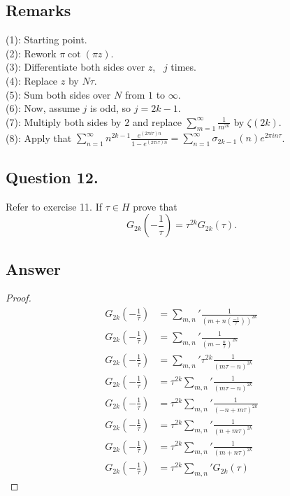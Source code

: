 \subsection*{Remarks}
\noindent
(1): Starting point.\\
(2): Rework $\pi \cot(\pi z) $. \\
(3): Differentiate both sides over $z$, \  $j$ times. \\
(4): Replace $z$ by $N\tau$. \\
(5): Sum both sides over $N$ from $1$ to $\infty$.\\
(6): Now, assume $j$ is odd, so $j=2k-1$. \\
(7): Multiply both sides by $2$ and replace $\sum_{m=1}^\infty \frac{1}{m^{2k}}$ by $\zeta(2k)$.\\
(8): Apply that $\sum_{n=1}^\infty n^{2k-1} \frac{e^{(2 \pi i \tau)n}}{1-e^{(2 \pi i \tau)n}} = \sum_{n=1}^{\infty}\sigma_{2k-1}(n)e^{2\pi i n \tau}$.

\subsection{Question 12.}
\noindent
Refer to exercise 11. If $\tau \in H$ prove that
\[
    G_{2k}(-\frac{1}{\tau}) = \tau^{2k} G_{2k}(\tau).
\]

\subsection*{Answer}

\begin{proof}
    \begin{align*}
        G_{2k}(-\frac{1}{\tau}) &= \sum_{m,n}{'} \frac{1}{(m + n (\frac{-1}{\tau}))^{2k}} \\
        G_{2k}(-\frac{1}{\tau}) &= \sum_{m,n}{'} \frac{1}{(m - \frac{n}{\tau})^{2k}} \\
        G_{2k}(-\frac{1}{\tau}) &= \sum_{m,n}{'} \tau^{2k} \frac{1}{(m\tau - n)^{2k}} \\
        G_{2k}(-\frac{1}{\tau}) &= \tau^{2k} \sum_{m,n}{'} \frac{1}{(m\tau - n)^{2k}} \\
        G_{2k}(-\frac{1}{\tau}) &= \tau^{2k} \sum_{m,n}{'} \frac{1}{(-n +m\tau)^{2k}} \\
        G_{2k}(-\frac{1}{\tau}) &= \tau^{2k} \sum_{m,n}{'} \frac{1}{(n + m\tau)^{2k}} \\
        G_{2k}(-\frac{1}{\tau}) &= \tau^{2k} \sum_{m,n}{'} \frac{1}{(m + n\tau)^{2k}} \\
        G_{2k}(-\frac{1}{\tau}) &= \tau^{2k} \sum_{m,n}{'} G_{2k}(\tau)
    \end{align*}

\end{proof}


